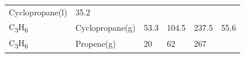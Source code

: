 \documentclass[
  9pt,
]{extbook}
\theoremstyle{definition}
\theoremstyle{definition}
\theoremstyle{definition}
\theoremstyle{remark}
\begin{document}
\begin{longtable}[]{@{}llllll@{}}
\begin{minipage}[t]{0.17\columnwidth}
Cyclopropane(l)\strut
\end{minipage} & \begin{minipage}[t]{0.15\columnwidth}\raggedright
35.2\strut
\end{minipage} & \begin{minipage}[t]{0.15\columnwidth}\raggedright
\strut
\end{minipage} & \begin{minipage}[t]{0.14\columnwidth}\raggedright
\strut
\end{minipage} & \begin{minipage}[t]{0.14\columnwidth}\raggedright
\strut
\end{minipage}\tabularnewline
\begin{minipage}[t]{0.07\columnwidth}\raggedright
C\textsubscript{3}H\textsubscript{6}\strut
\end{minipage} & \begin{minipage}[t]{0.17\columnwidth}\raggedright
Cyclopropane(g)\strut
\end{minipage} & \begin{minipage}[t]{0.15\columnwidth}\raggedright
53.3\strut
\end{minipage} & \begin{minipage}[t]{0.15\columnwidth}\raggedright
104.5\strut
\end{minipage} & \begin{minipage}[t]{0.14\columnwidth}\raggedright
237.5\strut
\end{minipage} & \begin{minipage}[t]{0.14\columnwidth}\raggedright
55.6\strut
\end{minipage}\tabularnewline
\begin{minipage}[t]{0.07\columnwidth}\raggedright
C\textsubscript{3}H\textsubscript{6}\strut
\end{minipage} & \begin{minipage}[t]{0.17\columnwidth}\raggedright
Propene(g)\strut
\end{minipage} & \begin{minipage}[t]{0.15\columnwidth}\raggedright
20\strut
\end{minipage} & \begin{minipage}[t]{0.15\columnwidth}\raggedright
62\strut
\end{minipage} & \begin{minipage}[t]{0.14\columnwidth}\raggedright
267\strut
\end{minipage} & \begin{minipage}[t]{0.14\columnwidth}\raggedright

\end{minipage}
\end{longtable}
\end{document}
